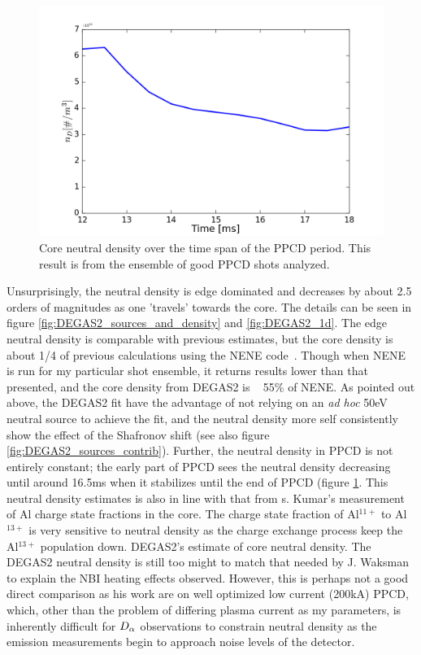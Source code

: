 \begin{figure}
    \centering
    \includegraphics[width=0.8\linewidth]{ion_transport_results/neutral_vs_time.png}
    \caption[Core neutral density over time]{Core neutral density over the time span of the PPCD period. This result is from the ensemble of good PPCD shots analyzed.}
    \label{fig:neutral_vs_time}
\end{figure}

Unsurprisingly, the neutral density is edge dominated and decreases by about 2.5 orders of magnitudes as one 'travels' towards the core. The details can be seen in figure \ref{fig:DEGAS2_sources_and_density} and \ref{fig:DEGAS2_1d}. The edge neutral density is comparable with previous estimates, but the core density is about 1/4 of previous calculations using the NENE code~\cite{Eilerman2010}. %
Though when NENE is run for my particular shot ensemble, it returns results lower than that presented, and the core density from DEGAS2 is ~ 55\% of NENE. As pointed out above, the DEGAS2 fit have the advantage of not relying on an \textit{ad hoc} 50eV neutral source to achieve the fit, and the neutral density more self consistently show the effect of the Shafronov shift (see also figure \ref{fig:DEGAS2_sources_contrib}). 
Further, the neutral density in PPCD is not entirely constant; the early part of PPCD sees the neutral density decreasing until around 16.5ms when it stabilizes until the end of PPCD (figure \ref{fig:neutral_vs_time}. This neutral density estimates is also in line with that from s. Kumar's measurement of Al charge state fractions in the core. The charge state fraction of Al$^{11+}$ to Al$^{13+}$ is very sensitive to neutral density as the charge exchange process keep the Al$^{13+}$ population down. DEGAS2's estimate of core neutral density. The DEGAS2 neutral density is still too might to match that needed by J. Waksman to explain the NBI heating effects observed. However, this is perhaps not a good direct comparison as his work are on well optimized low current (200kA) PPCD, which, other than the problem of differing plasma current as my parameters, is inherently difficult for $D_{\alpha}$ observations to constrain neutral density as the emission measurements begin to approach noise levels of the detector. 

